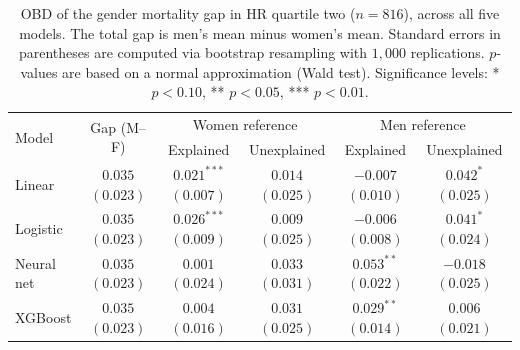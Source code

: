 \begin{table}[!ht]
    \caption{OBD of the gender mortality gap in HR quartile two ($n = 816$), across all five models. The total gap is men's mean minus women's mean. Standard errors in parentheses are computed via bootstrap resampling with $1{,}000$ replications. $p$-values are based on a normal approximation (Wald test). Significance levels: * $p<0.10$, ** $p<0.05$, *** $p<0.01$.}
    \label{tab:hrq2_bootstrap_models}
    \centering
    \scriptsize
    \begin{tabular}{@{}lc*{4}{c}@{}}
    \toprule
    \multirow{2}{*}{Model} &
    \multirow{2}{*}{Gap (M--F)} &
    \multicolumn{2}{c}{Women reference} &
    \multicolumn{2}{c}{Men reference} \\
    \cmidrule(lr){3-4} \cmidrule(lr){5-6}
    & & Explained & Unexplained & Explained & Unexplained \\
    \midrule

    Linear
        & \makecell{$0.035$ \\ $(0.023)$}
        & \makecell{$0.021^{***}$ \\ $(0.007)$}
        & \makecell{$0.014$ \\ $(0.025)$}
        & \makecell{$-0.007$ \\ $(0.010)$}
        & \makecell{$0.042^{*}$ \\ $(0.025)$} \\[0.3em]

    Logistic
        & \makecell{$0.035$ \\ $(0.023)$}
        & \makecell{$0.026^{***}$ \\ $(0.009)$}
        & \makecell{$0.009$ \\ $(0.025)$}
        & \makecell{$-0.006$ \\ $(0.008)$}
        & \makecell{$0.041^{*}$ \\ $(0.024)$} \\[0.3em]

    Neural net
        & \makecell{$0.035$ \\ $(0.023)$}
        & \makecell{$0.001$ \\ $(0.024)$}
        & \makecell{$0.033$ \\ $(0.031)$}
        & \makecell{$0.053^{**}$ \\ $(0.022)$}
        & \makecell{$-0.018$ \\ $(0.025)$} \\[0.3em]

    XGBoost
        & \makecell{$0.035$ \\ $(0.023)$}
        & \makecell{$0.004$ \\ $(0.016)$}
        & \makecell{$0.031$ \\ $(0.025)$}
        & \makecell{$0.029^{**}$ \\ $(0.014)$}
        & \makecell{$0.006$ \\ $(0.021)$} \\[0.3em]


\end{tabular}
\end{table}
